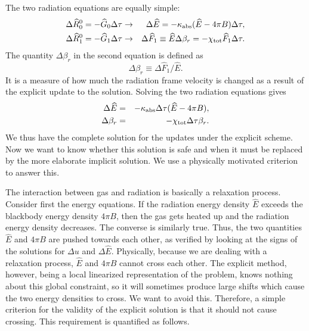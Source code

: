 \documentclass[12pt,preprint]{aastex}
\begin{document}
The two radiation equations are equally simple:
\begin{eqnarray}
\Delta \widehat{R}^0_0 = -\widehat{G}_0\Delta\tau &\to& \Delta
\widehat{E} = -\kappa_{\rm abs} (\widehat{E}-4\pi B)\Delta \tau,
\\ \Delta \widehat{R}^0_1 = -\widehat{G}_1 \Delta\tau &\to& 
\Delta \widehat{F}_1 \equiv \widehat{E} \Delta\beta_r = -\chi_{\rm tot}
\widehat{F}_1 \Delta \tau.
\end{eqnarray}
The quantity $\Delta\beta_r$ in the second equation is defined as
\begin{equation}
\Delta\beta_r \equiv \Delta\widehat{F}_1/\widehat{E}.
\end{equation}
It is a measure of how much the radiation frame velocity is changed as
a result of the explicit update to the solution. Solving the two
radiation equations gives
\begin{eqnarray}
\Delta \widehat{E} &=& -\kappa_{\rm abs}\Delta\tau (\widehat{E}-4\pi
B), \\ \Delta \beta_r &=& -\chi_{\rm tot}\Delta\tau \beta_r.
\end{eqnarray}
We thus have the complete solution for the updates under the explicit
scheme.  Now we want to know whether this solution is safe and when it
must be replaced by the more elaborate implicit solution. We use a
physically motivated criterion to answer this.

The interaction between gas and radiation is basically a relaxation
process. Consider first the energy equations. If the radiation energy
density $\widehat{E}$ exceeds the blackbody energy density $4\pi B$,
then the gas gets heated up and the radiation energy density
decreases. The converse is similarly true. Thus, the two quantities
$\widehat{E}$ and $4\pi B$ are pushed towards each other, as verified
by looking at the signs of the solutions for $\Delta u$ and
$\Delta\widehat{E}$. Physically, because we are dealing with a
relaxation process, $\widehat{E}$ and $4\pi B$ cannot cross each
other. The explicit method, however, being a local linearized
representation of the problem, knows nothing about this global
constraint, so it will sometimes produce large shifts which cause the
two energy densities to cross. We want to avoid this.  Therefore, a
simple criterion for the validity of the explicit solution is that it
should not cause crossing. This requirement is quantified as follows.
\end{document}
